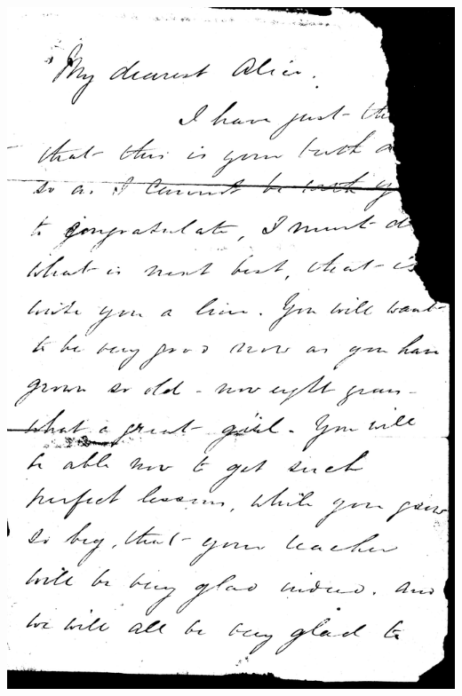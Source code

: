 \documentclass[12pt]{article}
\begin{document}
\includegraphics[width=\textwidth]{RobtCarley1.pdf}
\end{document}

